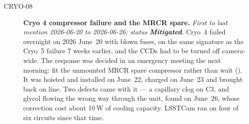 \begin{description}
\item[CRYO-08]\label{iss:CRYO-08} \textbf{Cryo 4 compressor failure and the MRCR spare.}
  \emph{First to last mention 2026-06-20 to 2026-06-26; status \textcolor{stmit}{\textbf{Mitigated}}.}
  Cryo~4 failed overnight on 2026 June~20 with blown fuses, on the same signature as the Cryo~5 failure 7 weeks earlier, and the CCDs had to be turned off camera-wide.  The response was decided in an emergency meeting the next morning: fit the unmounted MRCR spare compressor rather than wait ().  It was hoisted and installed on June~22, charged on June~23 and brought back on line.  Two defects came with it --- a capillary clog on C3, and glycol flowing the wrong way through the unit, found on June~26, whose correction cost about 10\,W of cooling capacity.  LSSTCam ran on four of six circuits since that time.

\end{description}

